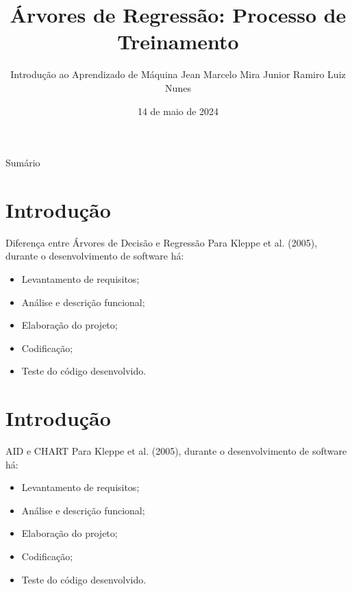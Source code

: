 \documentclass[handout,aspectratio = 169]{beamer}
\title{Árvores de Regressão: Processo de Treinamento}
\date{14 de maio de 2024}
\author[]{
    Introdução ao Aprendizado de Máquina
    \newline
    \newline Jean Marcelo Mira Junior
    \newline Ramiro Luiz Nunes
}
\begin{document}

\frame{\titlepage}
\section[]{}
\begin{frame}{Sumário}
  \tableofcontents
\end{frame}


\section{Introdução}

\begin{frame}{Diferença entre Árvores de Decisão e Regressão}
    Para Kleppe et al. (2005), durante o desenvolvimento de software há:
    \begin{itemize}
        \item Levantamento de requisitos;
        \item Análise e descrição funcional;
        \item Elaboração do projeto;
        \item Codificação;
        \item Teste do código desenvolvido.
    \end{itemize}
\end{frame}

\section{Introdução}

\begin{frame}{AID e CHART}
    Para Kleppe et al. (2005), durante o desenvolvimento de software há:
    \begin{itemize}
        \item Levantamento de requisitos;
        \item Análise e descrição funcional;
        \item Elaboração do projeto;
        \item Codificação;
        \item Teste do código desenvolvido.
    \end{itemize}
\end{frame}
\end{document}
